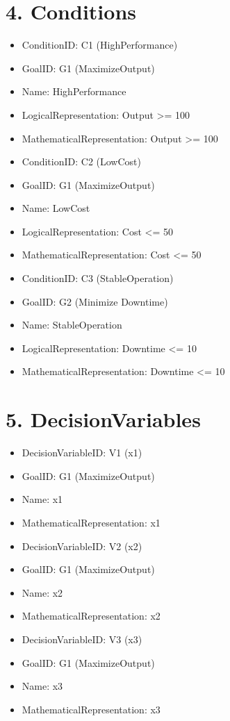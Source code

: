 \documentclass{article}
\begin{document}
\section{4. Conditions}
\begin{itemize}
    \item ConditionID: C1 (HighPerformance)
        \item GoalID: G1 (MaximizeOutput)
        \item Name: HighPerformance
        \item LogicalRepresentation: Output >= 100
        \item MathematicalRepresentation: Output >= 100
    \item ConditionID: C2 (LowCost)
        \item GoalID: G1 (MaximizeOutput)
        \item Name: LowCost
        \item LogicalRepresentation: Cost <= 50
        \item MathematicalRepresentation: Cost <= 50
    \item ConditionID: C3 (StableOperation)
        \item GoalID: G2 (Minimize Downtime)
        \item Name: StableOperation
        \item LogicalRepresentation: Downtime <= 10
        \item MathematicalRepresentation: Downtime <= 10
\end{itemize}

\section{5. DecisionVariables}
\begin{itemize}
    \item DecisionVariableID: V1 (x1)
        \item GoalID: G1 (MaximizeOutput)
        \item Name: x1
        \item MathematicalRepresentation: x1
    \item DecisionVariableID: V2 (x2)
        \item GoalID: G1 (MaximizeOutput)
        \item Name: x2
        \item MathematicalRepresentation: x2
    \item DecisionVariableID: V3 (x3)
        \item GoalID: G1 (MaximizeOutput)
        \item Name: x3
        \item MathematicalRepresentation: x3
\end{itemize}
\end{document}
